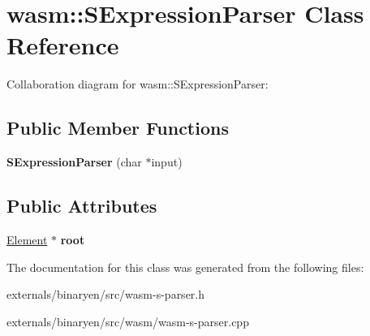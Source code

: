 \hypertarget{classwasm_1_1_s_expression_parser}{}\section{wasm\+:\+:S\+Expression\+Parser Class Reference}
\label{classwasm_1_1_s_expression_parser}


Collaboration diagram for wasm\+:\+:S\+Expression\+Parser\+:
\subsection*{Public Member Functions}
\begin{DoxyCompactItemize}
\item 
\mbox{\label{classwasm_1_1_s_expression_parser_a7f8f4582663cb5eb2d5f77af4e1b4185}} 
{\bfseries S\+Expression\+Parser} (char $\ast$input)
\end{DoxyCompactItemize}
\subsection*{Public Attributes}
\begin{DoxyCompactItemize}
\item 
\mbox{\label{classwasm_1_1_s_expression_parser_a3cc8ea6679dabf2c3b0577ead4577e44}} 
\mbox{\hyperlink{classwasm_1_1_element}{Element}} $\ast$ {\bfseries root}
\end{DoxyCompactItemize}


The documentation for this class was generated from the following files\+:\begin{DoxyCompactItemize}
\item 
externals/binaryen/src/wasm-\/s-\/parser.\+h\item 
externals/binaryen/src/wasm/wasm-\/s-\/parser.\+cpp\end{DoxyCompactItemize}
